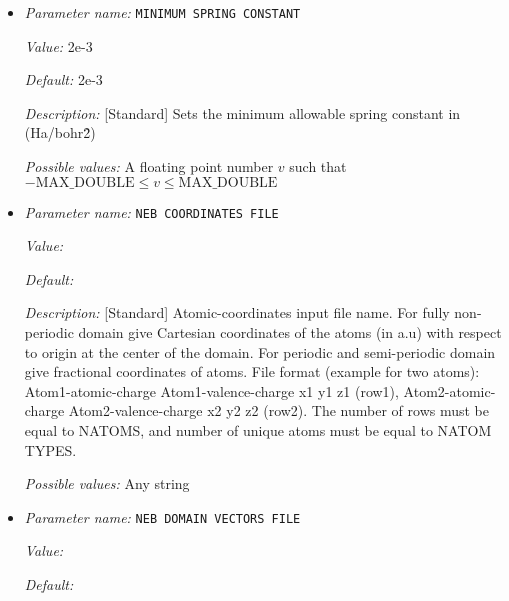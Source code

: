 \begin{itemize}
{\it Value:} 5


{\it Default:} 5


{\it Description:} [Standard] Sets the maximum number of line search iterations in the case of CGPRP. Default is 5.


{\it Possible values:} An integer $n$ such that $1\leq n \leq 100$
\item {\it Parameter name:} {\tt MINIMUM SPRING CONSTANT}
\label{parameters:NEB/MINIMUM SPRING CONSTANT}
\label{parameters:NEB/MINIMUM_20SPRING_20CONSTANT}


{\it Value:} 2e-3


{\it Default:} 2e-3


{\it Description:} [Standard] Sets the minimum allowable spring constant in (Ha/bohr\^2)


{\it Possible values:} A floating point number $v$ such that $-\text{MAX\_DOUBLE} \leq v \leq \text{MAX\_DOUBLE}$
\item {\it Parameter name:} {\tt NEB COORDINATES FILE}
\label{parameters:NEB/NEB COORDINATES FILE}
\label{parameters:NEB/NEB_20COORDINATES_20FILE}


{\it Value:} 


{\it Default:} 


{\it Description:} [Standard] Atomic-coordinates input file name. For fully non-periodic domain give Cartesian coordinates of the atoms (in a.u) with respect to origin at the center of the domain. For periodic and semi-periodic domain give fractional coordinates of atoms. File format (example for two atoms): Atom1-atomic-charge Atom1-valence-charge x1 y1 z1 (row1), Atom2-atomic-charge Atom2-valence-charge x2 y2 z2 (row2). The number of rows must be equal to NATOMS, and number of unique atoms must be equal to NATOM TYPES.


{\it Possible values:} Any string
\item {\it Parameter name:} {\tt NEB DOMAIN VECTORS FILE}
\label{parameters:NEB/NEB DOMAIN VECTORS FILE}
\label{parameters:NEB/NEB_20DOMAIN_20VECTORS_20FILE}


{\it Value:} 


{\it Default:} 



\end{itemize}
